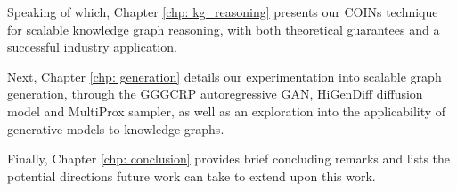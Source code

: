Speaking of which, Chapter \ref{chp: kg_reasoning} presents our COINs technique for scalable knowledge graph reasoning, with both theoretical guarantees and a successful industry application.

Next, Chapter \ref{chp: generation} details our experimentation into scalable graph generation, through the GGGCRP autoregressive GAN, HiGenDiff diffusion model and MultiProx sampler, as well as an exploration into the applicability of generative models to knowledge graphs. 

Finally, Chapter \ref{chp: conclusion} provides brief concluding remarks and lists the potential directions future work can take to extend upon this work.